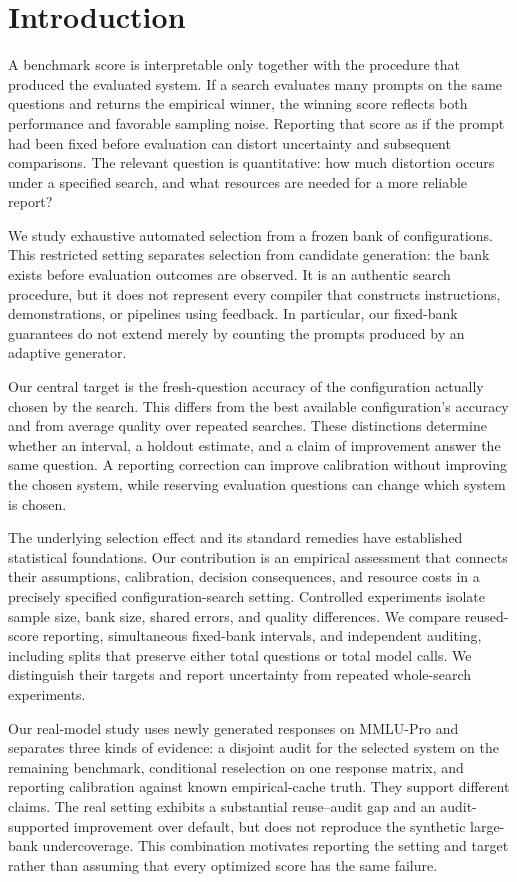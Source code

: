 \section{Introduction}
A benchmark score is interpretable only together with the procedure that produced the evaluated system. If a search evaluates many prompts on the same questions and returns the empirical winner, the winning score reflects both performance and favorable sampling noise. Reporting that score as if the prompt had been fixed before evaluation can distort uncertainty and subsequent comparisons. The relevant question is quantitative: how much distortion occurs under a specified search, and what resources are needed for a more reliable report?

We study exhaustive automated selection from a frozen bank of configurations. This restricted setting separates selection from candidate generation: the bank exists before evaluation outcomes are observed. It is an authentic search procedure, but it does not represent every compiler that constructs instructions, demonstrations, or pipelines using feedback. In particular, our fixed-bank guarantees do not extend merely by counting the prompts produced by an adaptive generator.

Our central target is the fresh-question accuracy of the configuration actually chosen by the search. This differs from the best available configuration's accuracy and from average quality over repeated searches. These distinctions determine whether an interval, a holdout estimate, and a claim of improvement answer the same question. A reporting correction can improve calibration without improving the chosen system, while reserving evaluation questions can change which system is chosen.

The underlying selection effect and its standard remedies have established statistical foundations. Our contribution is an empirical assessment that connects their assumptions, calibration, decision consequences, and resource costs in a precisely specified configuration-search setting. Controlled experiments isolate sample size, bank size, shared errors, and quality differences. We compare reused-score reporting, simultaneous fixed-bank intervals, and independent auditing, including splits that preserve either total questions or total model calls. We distinguish their targets and report uncertainty from repeated whole-search experiments.

Our real-model study uses newly generated responses on MMLU-Pro and separates three kinds of evidence: a disjoint audit for the selected system on the remaining benchmark, conditional reselection on one response matrix, and reporting calibration against known empirical-cache truth. They support different claims. The real setting exhibits a substantial reuse--audit gap and an audit-supported improvement over default, but does not reproduce the synthetic large-bank undercoverage. This combination motivates reporting the setting and target rather than assuming that every optimized score has the same failure.
